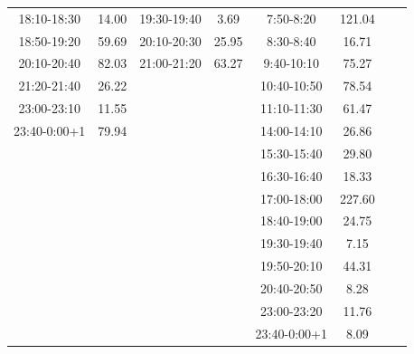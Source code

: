 \documentclass{cumcm2026}
\begin{document}
\begin{table}[htbp]
\begin{tabular}{@{}c c c c c c c c@{}}
18:10-18:30 & 14.00 & 19:30-19:40 & 3.69 & 7:50-8:20 & 121.04 &  &  \\
18:50-19:20 & 59.69 & 20:10-20:30 & 25.95 & 8:30-8:40 & 16.71 &  &  \\
20:10-20:40 & 82.03 & 21:00-21:20 & 63.27 & 9:40-10:10 & 75.27 &  &  \\
21:20-21:40 & 26.22 &  &  & 10:40-10:50 & 78.54 &  &  \\
23:00-23:10 & 11.55 &  &  & 11:10-11:30 & 61.47 &  &  \\
23:40-0:00+1 & 79.94 &  &  & 14:00-14:10 & 26.86 &  &  \\
 &  &  &  & 15:30-15:40 & 29.80 &  &  \\
 &  &  &  & 16:30-16:40 & 18.33 &  &  \\
 &  &  &  & 17:00-18:00 & 227.60 &  &  \\
 &  &  &  & 18:40-19:00 & 24.75 &  &  \\
 &  &  &  & 19:30-19:40 & 7.15 &  &  \\
 &  &  &  & 19:50-20:10 & 44.31 &  &  \\
 &  &  &  & 20:40-20:50 & 8.28 &  &  \\
 &  &  &  & 23:00-23:20 & 11.76 &  &  \\
 &  &  &  & 23:40-0:00+1 & 8.09 &  &  \\
\bottomrule
\end{tabular}
\end{table}
\end{document}
